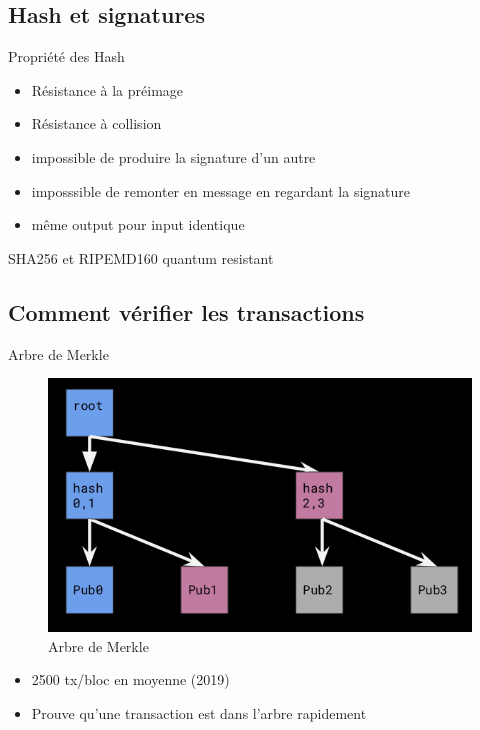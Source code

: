 \documentclass[presentation]{beamer}
\begin{document}
\subsection{Hash et signatures}
\label{sec:orgf8b45b8}
\begin{frame}[label={sec:org1416328}]{Propriété des Hash}
\begin{itemize}
\item Résistance à la préimage
\item Résistance à collision
\item impossible de produire la signature d'un autre
\item imposssible de remonter en message en regardant la signature
\item même output pour input identique
\end{itemize}
\begin{block}{SHA256 et RIPEMD160}
quantum resistant
\end{block}
\end{frame}

\subsection{Comment vérifier les transactions}
\label{sec:org7e10f49}
\begin{frame}[label={sec:org6897415}]{Arbre de Merkle}
\begin{figure}[htbp]
\centering
\includegraphics[height=.8\textheight]{Images/merkle.png}
\caption{Arbre de Merkle}
\end{figure}

\begin{itemize}
\item 2500 tx/bloc en moyenne (2019)
\item Prouve qu'une transaction est dans l'arbre rapidement
\end{itemize}
\end{frame}
\end{document}
